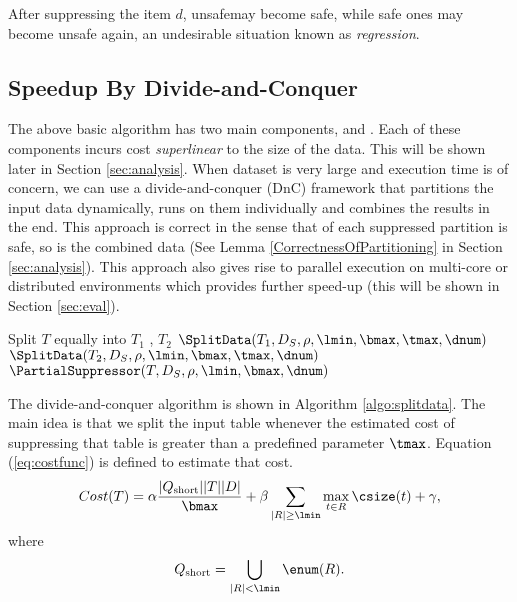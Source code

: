 After suppressing the item $d$, unsafe\qids may become safe,
while safe ones may become unsafe again, an undesirable situation known as
{\em regression}.


\subsection{Speedup By Divide-and-Conquer}
\label{subsec:speedup}

The above basic algorithm has two main components, \HandleShortRecords and
\HandleLongRecord. Each of these components incurs cost {\em superlinear}
to the size of the data. This will be shown later in Section \ref{sec:analysis}.
When dataset is very large and execution time is of concern,
we can use a divide-and-conquer (DnC) framework that partitions the input data
dynamically, runs \PartialSuppressor on them individually and combines the results
in the end. This approach is correct in the sense that of each suppressed
partition is safe, so is the combined data (See Lemma
\ref{CorrectnessOfPartitioning} in Section \ref{sec:analysis}).
This approach also gives rise to parallel execution on multi-core or
distributed environments which provides further speed-up (this will be shown
in Section \ref{sec:eval}).

\begin{algorithm}
\caption{$\SplitData(T, D_S, \rho, \lmin, \bmax, \tmax, \dnum)$}
\label{algo:splitdata}
\begin{algorithmic}[1]
        \STATE Split $T$ equally into $T_1$ , $T_2$
        \STATE $\SplitData(T_1, D_S, \rho, \lmin, \bmax, \tmax, \dnum)$
        \STATE $\SplitData(T_2, D_S, \rho, \lmin, \bmax, \tmax, \dnum)$
    \ELSE
        \STATE $\PartialSuppressor(T, D_S, \rho, \lmin, \bmax, \dnum)$
    \ENDIF
\end{algorithmic}
\end{algorithm}

The divide-and-conquer algorithm is shown in Algorithm \ref{algo:splitdata}.
The main idea is that we split the input table whenever the estimated
cost of suppressing that table is greater than a predefined parameter $\tmax$.
Equation (\ref{eq:costfunc}) is defined to estimate that cost.
\begin{equation}\label{eq:costfunc}
    Cost(T)= \alpha \frac{|Q_\text{short}| |T| |D|}{\bmax}+\beta \sum_{|R| \ge \lmin}
\max_{t \in R} \csize(t)+\gamma,
\end{equation}
where \[ Q_\text{short}=\bigcup_{|R|<\lmin}\enum(R).\]

